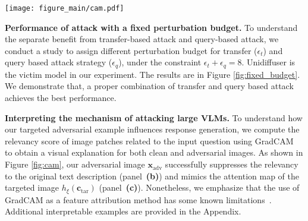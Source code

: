 \begin{figure*}[t]
    \centering
    \texttt{[image: figure\_main/cam.pdf]}
    \caption{
    \textbf{Visually interpreting our attacking mechanism.}
    To better comprehend the mechanism by which our adversarial examples deceive large VLMs (here we evaluate Img2Prompt), we employ interpretable visualization with GradCAM~\citep{Selvaraju_2017_ICCV}. \textbf{(a)} An example of $\boldsymbol{x}_{\text{cle}}$, $\boldsymbol{x}_{\text{adv}}$, and $h_{\xi}(\boldsymbol{c}_{\text{tar}})$, along with the responses they generate. We select the targeted text as \texttt{a beautiful bird with a black and white color in snow}. \textbf{(b)} GradCAM visualization when the input question is: \texttt{what is the teddy bear playing in the middle of the road?} As seen, GradCAM can effectively highlight the skateboard for $\boldsymbol{x}_{\text{cle}}$, whereas GradCAM highlights irrelevant backgrounds for $\boldsymbol{x}_{\text{adv}}$. \textbf{(c)} If we feed the targeted text as the question, GradCAM will highlight similar regions of $\boldsymbol{x}_{\text{adv}}$ and $h_{\xi}(\boldsymbol{c}_{\text{tar}})$.
    }
    \label{fig:cam}
\end{figure*}

\textbf{Performance of attack with a fixed perturbation budget.}
To understand the separate benefit from transfer-based attack and query-based attack, we conduct a study to assign different perturbation budget for transfer ($\epsilon_{t}$) and query based attack strategy ($\epsilon_{q}$), under the constraint $\epsilon_{t}+\epsilon_{q}=8$.
Unidiffuser is the victim model in our experiment. The results are in Figure \ref{fig:fixed_budget}. We demonstrate that, a proper combination of transfer and query based attack achieves the best performance.

\textbf{Interpreting the mechanism of attacking large VLMs.} To understand how our targeted adversarial example influences response generation, we compute the relevancy score of image patches related to the input question using GradCAM~\citep{Selvaraju_2017_ICCV} to obtain a visual explanation for both clean and adversarial images. As shown in Figure \ref{fig:cam}, our adversarial image $\boldsymbol{x}_\text{adv}$ successfully suppresses the relevancy to the original text description (panel~\textbf{(b)}) and mimics the attention map of the targeted image $h_{\xi}(\boldsymbol{c}_\text{tar})$ (panel~\textbf{(c)}). 
Nonetheless, we emphasize that the use of GradCAM as a feature attribution method has some known limitations~\citep{chattopadhay2018grad}. 
Additional interpretable examples are provided in the Appendix.

